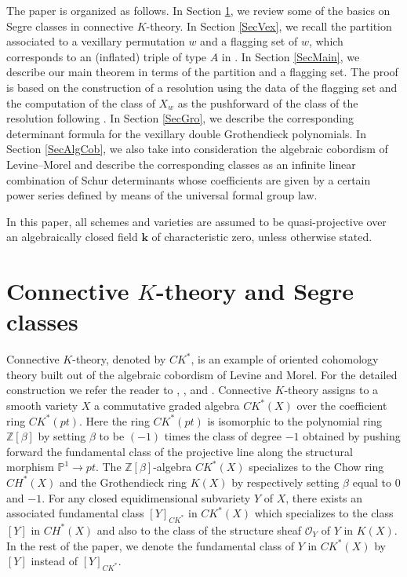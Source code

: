 \documentclass[12pt, reqno,sumlimits]{amsart}
\theoremstyle{definition}
\numberwithin{equation}{section}
\newcommand{\PP}{{\mathbb P}}
\newcommand{\ZZ}{{\mathbb Z}}
\newcommand{\bfk}{{\mathbf k }}
\newcommand{\CH}{{C\!H}}
\newcommand{\CK}{{C\!K}}
\begin{document}
The paper is organized as follows. In Section \ref{SecCK}, we review some of the basics on Segre classes in connective $K$-theory. In Section \ref{SecVex}, we recall the partition associated to a vexillary permutation $w$ and a flagging set of $w$, which corresponds to an (inflated) triple of type $A$ in \cite{AndersonFulton2}. In Section \ref{SecMain}, we describe our main theorem in terms of the partition and a flagging set. The proof is based on the construction of a resolution using the data of the flagging set and the computation of the class of $X_w$ as the pushforward of the class of the resolution following \cite{HIMN}. In Section \ref{SecGro}, we describe the corresponding determinant formula for the vexillary double Grothendieck polynomials. In Section \ref{SecAlgCob}, we also take into consideration the algebraic cobordism of Levine--Morel \cite{LevineMorel} and describe the corresponding classes as an infinite linear combination of Schur determinants whose coefficients are given by a certain power series defined by means of the universal formal group law.

In this paper, all schemes and varieties are assumed to be quasi-projective over an algebraically closed field $\bfk$ of characteristic zero, unless otherwise stated.

\section{Connective $K$-theory and Segre classes}\label{SecCK}
Connective $K$-theory, denoted by $\CK^*$, is an example of oriented cohomology theory built out of the algebraic cobordism of Levine and Morel. For the detailed construction we refer the reader to \cite{DaiLevine}, \cite{Hudson}, and \cite{LevineMorel}. Connective $K$-theory assigns to a smooth variety $X$  a commutative graded algebra $\CK^*(X)$  over the coefficient ring $\CK^*({pt})$. Here the ring $\CK^*({pt})$ is isomorphic to the polynomial ring $\ZZ[\beta]$ by setting $\beta$ to be $(-1)$ times the class of degree $-1$ obtained by pushing forward the fundamental class of the projective line along the structural morphism $\PP^1 \to {pt}$. The $\ZZ[\beta]$-algebra $\CK^*(X)$ specializes to the Chow ring $\CH^*(X)$ and the Grothendieck ring $K(X)$ by respectively setting $\beta$ equal to $0$ and $-1$. For any closed equidimensional subvariety $Y$ of $X$, there exists an associated fundamental class  $[Y]_{\CK^*}$ in $\CK^*(X)$ which specializes to the class $[Y]$ in $\CH^*(X)$ and also to the class of the structure sheaf $\mathcal{O}_Y$ of $Y$ in $K(X)$. In the rest of the paper, we denote the fundamental class of $Y$ in $\CK^*(X)$ by $[Y]$ instead of $[Y]_{\CK^*}$.
\end{document}
